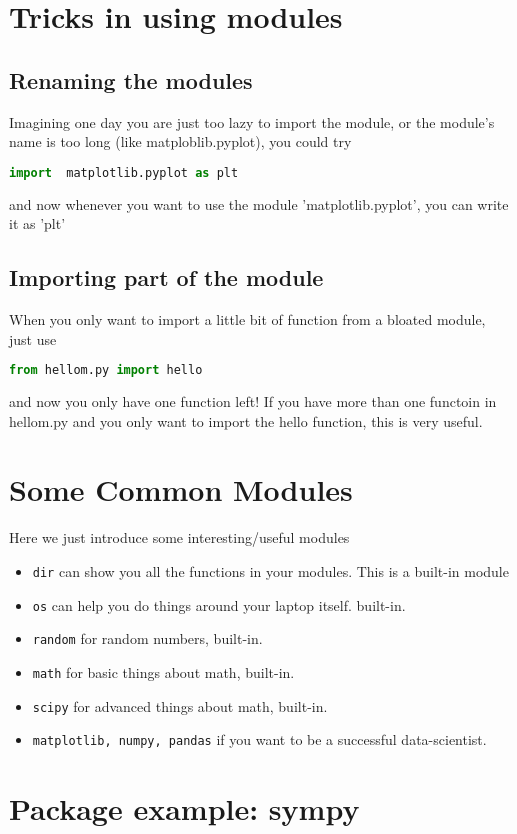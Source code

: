 \documentclass[12pt]{article}
\begin{document}
\section{Tricks in using modules}
\subsection{Renaming the modules}
Imagining one day you are just too lazy to import the module, or the module's name is too long (like matploblib.pyplot), you could try
\begin{lstlisting}[language=Python,caption="alias", captionpos=b]
	import  matplotlib.pyplot as plt
\end{lstlisting}

and now whenever you want to use the module 'matplotlib.pyplot', you can write it as 'plt'
\subsection{Importing part of the module}
When you only want to import a little bit of function from a bloated module, just use
\begin{lstlisting}[language=python,caption=import part]
	from hellom.py import hello
\end{lstlisting}
and now you only have one function left! If you have more than one functoin in hellom.py and you only want to import the hello function, this is very useful.
\section{Some Common Modules}
Here we just introduce some interesting/useful modules
\begin{itemize}
	\item \texttt{dir} can show you all the functions in your modules. This is a built-in module
	\item \texttt{os} can help you do things around your laptop itself. built-in.
	\item \texttt{random} for random numbers, built-in.
	\item \texttt{math} for basic things about math, built-in.
	\item \texttt{scipy} for advanced things about math, built-in.
	\item \texttt{matplotlib, numpy, pandas} if you want to be a successful data-scientist.
\end{itemize}
\section{Package example: sympy}
\end{document}
